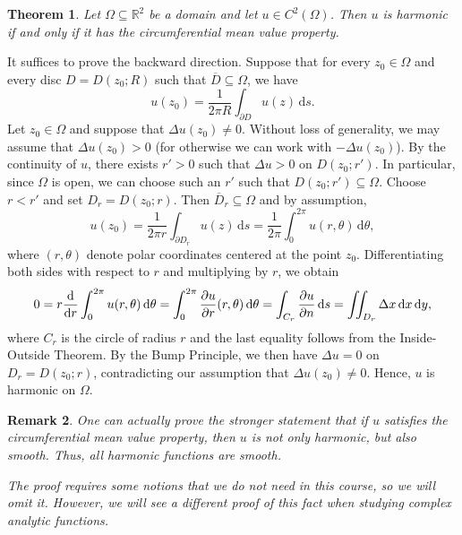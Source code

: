 \documentclass[10pt]{article}
\makeatletter
\newcommand{\R}{\mathbb{R}}
\newcommand{\dd}{\,\mathrm{d}}
\theoremstyle{newstyle}
\newtheorem{thm}{Theorem}[section]
\newtheorem{remark}[thm]{Remark}
\newenvironment{pf}[1][\proofname]{\par
  \pushQED{\qed}%
  \normalfont \topsep0\p@\relax
  \trivlist
  \item[\hskip\labelsep\scshape
  #1\@addpunct{.}]\ignorespaces
}{%
  \popQED\endtrivlist\@endpefalse
}
\makeatother
\begin{document}
\begin{thm}
Let $\Omega \subseteq \R^2$ be a domain and let $u \in C^2(\Omega)$. Then $u$ is harmonic 
if and only if it has the circumferential mean value property.
\end{thm}
\begin{pf}
It suffices to prove the backward direction. Suppose that for every $z_0 \in \Omega$ 
and every disc $D = D(z_0; R)$ such that $\overline{D} \subseteq \Omega$, we have 
\[ u(z_0) = \frac{1}{2\pi R} \int_{\partial D} u(z)\dd s. \]
Let $z_0 \in \Omega$ and suppose that $\Delta u(z_0) \neq 0$. Without loss of generality, 
we may assume that $\Delta u(z_0) > 0$ (for otherwise we can work with $-\Delta u(z_0)$). 
By the continuity of $u$, there exists $r' > 0$ such that $\Delta u > 0$ on 
$D(z_0; r')$. In particular, since $\Omega$ is open, we can choose such an $r'$ such that 
$D(z_0; r') \subseteq \Omega$. Choose $r < r'$ and set $D_r = D(z_0; r)$. Then 
$\overline{D}_r \subseteq \Omega$ and by assumption, 
\[ u(z_0) = \frac{1}{2\pi r} \int_{\partial D_r} u(z)\dd s = \frac{1}{2\pi} \int_0^{2\pi} 
u(r, \theta)\dd \theta, \]
where $(r, \theta)$ denote polar coordinates centered at the point $z_0$. Differentiating 
both sides with respect to $r$ and multiplying by $r$, we obtain 
\[ 0 = r \frac{\rm d}{{\rm d}r} \int_0^{2\pi} u(r, \theta)\dd \theta = 
\int_0^{2\pi} \frac{\partial u}{\partial r} (r, \theta)\dd\theta 
= \int_{C_r} \frac{\partial u}{\partial n}\dd s 
= \iint_{D_r} \Delta x \dd x \dd y, \]
where $C_r$ is the circle of radius $r$ and the last equality follows from the Inside-Outside Theorem.
By the Bump Principle, we then have $\Delta u = 0$ on $D_r = D(z_0; r)$, 
contradicting our assumption that $\Delta u(z_0) \neq 0$. Hence, $u$ is harmonic on $\Omega$.
\end{pf}

\begin{remark}
One can actually prove the stronger statement that if $u$ satisfies the circumferential mean 
value property, then $u$ is not only harmonic, but also smooth. Thus, all harmonic functions 
are smooth. 

The proof requires some notions that we do not need in this course, so we will omit it. 
However, we will see a different proof of this fact when studying complex analytic functions.
\end{remark}
\end{document}
